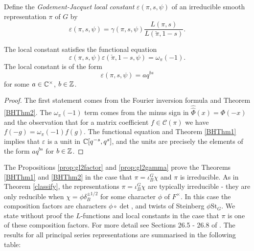 \begin{defn}
    Define the \textit{Godement-Jacquet local constant} $\varepsilon(\pi,s,\psi)$ of an irreducible smooth representation $\pi$ of $G$ by 
    $$\varepsilon(\pi,s,\psi) = \gamma(\pi,s,\psi) \frac{L(\pi,s)}{L(\check{\pi},1-s)}.$$
\end{defn}

\begin{cor}
    The local constant satisfies the functional equation
    $$\varepsilon(\pi,s,\psi)\varepsilon(\check{\pi},1-s,\psi) = \omega_\pi(-1).$$
    The local constant is of the form $$\varepsilon(\pi,s,\psi) = aq^{bs}$$ for some $a \in \mathbb{C}^\times$, $b \in \mathbb{Z}$. 
\end{cor}
\begin{proof}
    The first statement comes from the Fourier inversion formula and Theorem \ref{BHThm2}. The $\omega_\pi(-1)$ term comes from the minus sign in $\hat{\hat{\Phi}}(x)=\Phi(-x)$ and the observation that for a matrix coefficient $f \in \mathcal C(\pi)$ we have $f(-g)=\omega_\pi(-1)f(g)$. The functional equation and Theorem \ref{BHThm1} implies that $\varepsilon$ is a unit in $\mathbb{C}[q^{-s},q^s]$, and the units are precisely the elements of the form $aq^{bs}$ for $b \in \mathbb{Z}$.
\end{proof}

The Propositions \ref{prop:gl2factor} and \ref{prop:gl2gamma} prove the Theorems \ref{BHThm1} and \ref{BHThm2} in the case that $\pi = \iota_B^G \chi$ and $\pi$ is irreducible. As in Theorem \ref{classify}, the representations $\pi = \iota_B^G \chi$ are typically irreducible - they are only reducible when $\chi = \phi \delta_B^{\pm 1/2}$ for some character $\phi$ of $F^\times$. In this case the composition factors are characters $\phi \circ \det$, and twists of Steinberg $\phi \mathrm{St}_G$. We state without proof the $L$-functions and local constants in the case that $\pi$ is one of these composition factors. For more detail see Sections 26.5 - 26.8 of \cite{BH1}. The results for all principal series representations are summarised in the following table:

